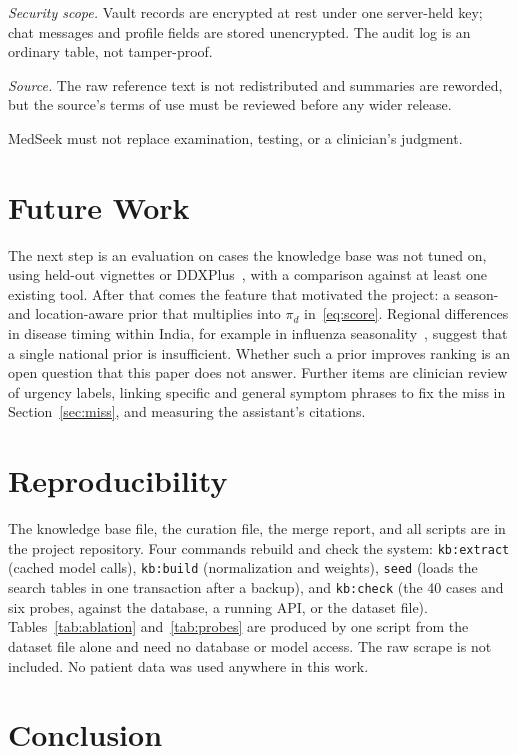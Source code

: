 \documentclass[conference]{IEEEtran}
\begin{document}
\textit{Security scope.} Vault records are encrypted at rest under one server-held key; chat messages and profile fields are stored unencrypted. The audit log is an ordinary table, not tamper-proof.

\textit{Source.} The raw reference text is not redistributed and summaries are reworded, but the source's terms of use must be reviewed before any wider release.

MedSeek must not replace examination, testing, or a clinician's judgment.

\section{Future Work}
\label{sec:future}

The next step is an evaluation on cases the knowledge base was not tuned on, using held-out vignettes or DDXPlus~\cite{fansi2022}, with a comparison against at least one existing tool. After that comes the feature that motivated the project: a season- and location-aware prior that multiplies into $\pi_d$ in~\eqref{eq:score}. Regional differences in disease timing within India, for example in influenza seasonality~\cite{chadha2015}, suggest that a single national prior is insufficient. Whether such a prior improves ranking is an open question that this paper does not answer. Further items are clinician review of urgency labels, linking specific and general symptom phrases to fix the miss in Section~\ref{sec:miss}, and measuring the assistant's citations.

\section{Reproducibility}

The knowledge base file, the curation file, the merge report, and all scripts are in the project repository. Four commands rebuild and check the system: \texttt{kb:extract} (cached model calls), \texttt{kb:build} (normalization and weights), \texttt{seed} (loads the search tables in one transaction after a backup), and \texttt{kb:check} (the 40 cases and six probes, against the database, a running API, or the dataset file). Tables~\ref{tab:ablation} and~\ref{tab:probes} are produced by one script from the dataset file alone and need no database or model access. The raw scrape is not included. No patient data was used anywhere in this work.

\section{Conclusion}
\end{document}
